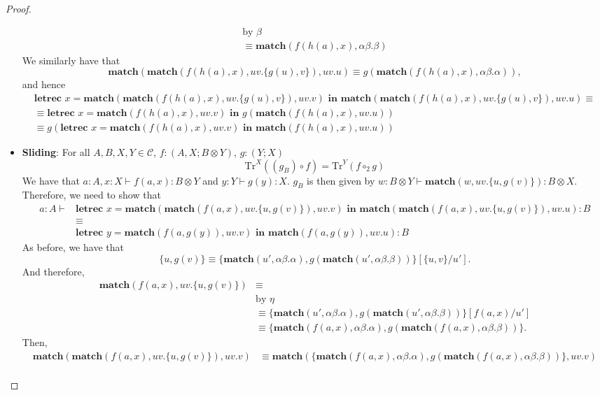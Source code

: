 \begin{example}
\begin{proof}
\begin{itemize}
\begin{align*}
\text{by $\beta$}\\
\equiv \textbf{match}(f(h(a),x), \alpha\beta.\beta)
\end{align*}
We similarly have that
\[
\textbf{match}(\textbf{match}(f(h(a),x),uv.\{g(u),v\}), uv.u) \equiv g(\textbf{match}(f(h(a),x), \alpha\beta.\alpha)),
\]
and hence
\begin{align*}
\textbf{letrec } x = \textbf{match}(\textbf{match}(f(h(a),x), uv.\{g(u),v\}), uv.v) \textbf{ in } \textbf{match}(\textbf{match}(f(h(a),x), uv.\{g(u),v\}),uv.u) \equiv\\
\equiv \textbf{letrec } x = \textbf{match}(f(h(a),x), uv.v) \textbf{ in } g(\textbf{match}(f(h(a),x), uv.u))\\
\equiv g(\textbf{letrec } x = \textbf{match}(f(h(a),x), uv.v) \textbf{ in } \textbf{match}(f(h(a),x), uv.u))
\end{align*}
\item \textbf{Sliding}: For all $A,B,X,Y \in \mathcal{C}$, $f : (A,X;B \otimes Y)$, $g : (Y;X)$
\[
\text{Tr}^{X}((g_{B}) \circ f) = \text{Tr}^{Y}(f \circ_2 g)
\]
We have that $a : A, x : X \vdash f(a,x) : B \otimes Y$ and $y : Y \vdash g(y) : X$.
$g_{B}$ is then given by $w : B \otimes Y \vdash \textbf{match}(w, uv. \{u, g(v)\}) : B \otimes X$.
Therefore, we need to show that
\begin{align*}
a : A \vdash &\textbf{letrec } x = \textbf{match}(\textbf{match}(f(a,x), uv.\{u,g(v)\}), uv.v) \textbf{ in } \textbf{match}(\textbf{match}(f(a,x), uv. \{u, g(v)\}), uv.u) : B\\
&\equiv\\ 
&\textbf{letrec } y = \textbf{match}(f(a,g(y)), uv.v) \textbf{ in } \textbf{match}(f(a,g(y)), uv.u): B
\end{align*}
As before, we have that
\[
\{u, g(v)\} \equiv \{\textbf{match}(u', \alpha\beta.\alpha), g(\textbf{match}(u', \alpha\beta.\beta))\}[\{u,v\}/u'].
\]
And therefore,
\begin{align*}
\textbf{match}(f(a,x), uv.\{u,g(v)\}) &\equiv\\
&\text{by $\eta$}\\
&\equiv \{\textbf{match}(u', \alpha\beta.\alpha), g(\textbf{match}(u', \alpha\beta.\beta))\}[f(a,x) / u']\\
&\equiv \{\textbf{match}(f(a,x), \alpha\beta.\alpha), g(\textbf{match}(f(a,x), \alpha\beta.\beta))\}.
\end{align*}
Then,
\begin{align*}
  \textbf{match}(\textbf{match}(f(a,x),uv.\{u,g(v)\}), uv.v) &\equiv \textbf{match}(\{\textbf{match}(f(a,x), \alpha\beta.\alpha), g(\textbf{match}(f(a,x), \alpha\beta.\beta))\}, uv.v)\\

\end{align*}
\end{itemize}
\end{proof}
\end{example}
